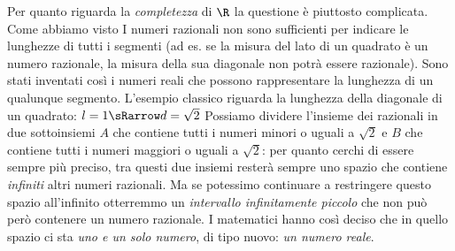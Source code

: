 Per quanto riguarda la \emph{completezza} di \(\R\) la questione è piuttosto 
complicata. 
Come abbiamo visto %
I numeri razionali non sono sufficienti per indicare le lunghezze di tutti i 
segmenti (ad es. se la misura del lato di un quadrato è un numero razionale, la 
misura della sua diagonale non potrà essere razionale).
Sono stati inventati così i numeri reali che possono rappresentare la lunghezza 
di un qualunque segmento.
L'esempio classico riguarda la lunghezza della diagonale di un quadrato: 
\(l=1 \sRarrow d=\sqrt{2}\)
Possiamo dividere l'insieme dei razionali in due sottoinsiemi \(A\) che 
contiene tutti i numeri minori o uguali a \(\sqrt{2}\) e \(B\) che contiene 
tutti i numeri maggiori o uguali a \(\sqrt{2}\): per quanto cerchi di essere 
sempre più preciso, tra questi due insiemi resterà sempre uno spazio che 
contiene \emph{infiniti} altri numeri razionali. 
Ma se potessimo continuare a restringere questo spazio all'infinito otterremmo 
un \emph{intervallo infinitamente piccolo} che non può però contenere un numero 
razionale. I matematici hanno così deciso che in quello spazio ci sta \emph{uno e 
un solo numero}, di tipo nuovo: \emph{un numero reale}.



